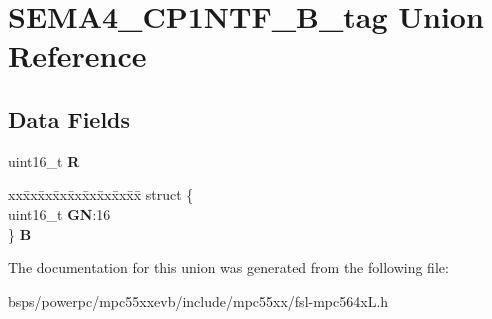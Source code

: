 \hypertarget{unionSEMA4__CP1NTF__16B__tag}{}\section{S\+E\+M\+A4\+\_\+\+C\+P1\+N\+T\+F\+\_\+B\+\_\+tag Union Reference}
\label{unionSEMA4__CP1NTF__16B__tag}
\subsection*{Data Fields}
\begin{DoxyCompactItemize}
\item 
\mbox{\label{unionSEMA4__CP1NTF__16B__tag_a042bc2ec2d374dbbee51bbc855cafcd8}} 
uint16\+\_\+t {\bfseries R}
\item 
\mbox{\label{unionSEMA4__CP1NTF__16B__tag_a316cc88dedc7ea7ead552610c2f71308}} 
\begin{tabbing}
xx\=xx\=xx\=xx\=xx\=xx\=xx\=xx\=xx\=\kill
struct \{\\
\>uint16\_t {\bfseries GN}:16\\
\} {\bfseries B}\\

\end{tabbing}\end{DoxyCompactItemize}


The documentation for this union was generated from the following file\+:\begin{DoxyCompactItemize}
\item 
bsps/powerpc/mpc55xxevb/include/mpc55xx/fsl-\/mpc564x\+L.\+h\end{DoxyCompactItemize}
